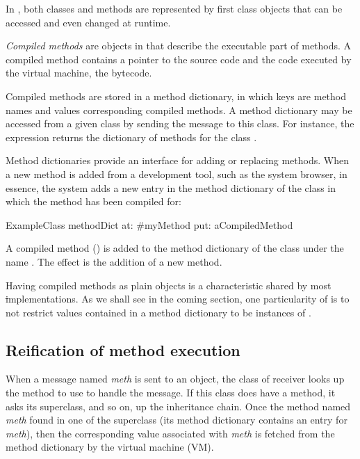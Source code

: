 \documentclass[a4paper,10pt,twoside]{book}
\begin{document}
In \pharo, both classes and methods are represented by first class objects that can be accessed and even changed at runtime. 

\emph{Compiled methods} are objects in \pharo that describe the executable part of methods. A compiled method contains a pointer to the source code and the code executed by the virtual machine, the bytecode.

Compiled methods are stored in a method dictionary, in which keys are method names and values corresponding compiled methods. A method dictionary may be accessed from a given class by sending the message  to this class. For instance, the expression  returns the dictionary of methods for the class .

Method dictionaries provide an interface for adding or replacing methods. When a new method is added from a development tool, such as the system browser, in essence, the system adds a new entry in the method dictionary of the class in which the method has been compiled for:

\begin{code}{}
ExampleClass methodDict at: #myMethod put: aCompiledMethod
\end{code}

A compiled method () is added to the method dictionary of the class  under the name . The effect is the addition of a new method.

Having compiled methods as plain objects is a characteristic shared by most \st implementations. As we shall see in the coming section, one particularity of \pharo is to not restrict values contained in a method dictionary to be instances of .

\subsection{Reification of method execution}

When a message named \emph{meth} is sent to an object, the class of receiver looks up the method to use to handle the message. If this class does have a method, it asks its superclass, and so on, up the inheritance chain. Once the method named \emph{meth} found in one of the superclass (\ie its method dictionary contains an entry for \emph{meth}), then the corresponding value associated with \emph{meth} is fetched from the method dictionary by the virtual machine (VM).
\end{document}
